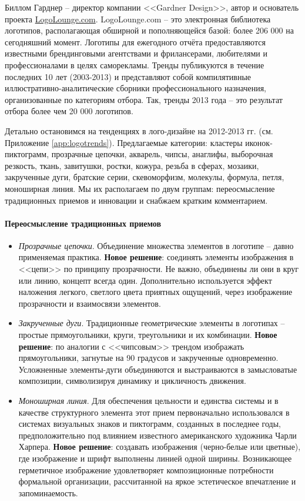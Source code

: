 Биллом Гарднер -- директор компании <<Gardner Design>>, автор и основатель проекта
\url{LogoLounge.com}. LogoLounge.com -- это электронная библиотека логотипов, располагающая обширной и
пополняющейся базой: более 206 000 на сегодняшний момент. Логотипы для ежегодного отчёта
предоставляются известными брендинговыми агентствами и фрилансерами, любителями и профессионалами в
целях саморекламы. Тренды публикуются в течение последних 10 лет (2003-2013) и представляют собой
компилятивные иллюстративно-аналитические сборники профессионального назначения, организованные по
категориям отбора. Так, тренды 2013 года -- это результат отбора более чем 20 000 логотипов.
\autocite{link:logolounge2012}\autocite{link:logolounge2013}

Детально остановимся на тенденциях в лого-дизайне на 2012-2013 гг.
(см. Приложение \ref{app:logotrends}). Предлагаемые категории: кластеры иконок-пиктограмм,
прозрачные цепочки, акварель, чипсы, анаглифы, выборочная резкость, ткань, завитушки, ростки,
кожура, резьба в сферах, мозаики, закрученные дуги, братские серии, скевоморфизм, молекулы, формула,
петля, моноширная линия.  Мы их располагаем по двум группам: переосмысление традиционных приемов
и инновации и снабжаем кратким комментарием.

\paragraph{Переосмысление традиционных приемов}
\begin{itemize}
\item \emph{Прозрачные цепочки}. Объединение множества элементов в логотипе -- давно применяемая
  практика. \textbf{Новое решение}: соединять элементы изображения в <<цепи>> по принципу
  прозрачности. Не важно, объединены ли они в круг или линию, концепт всегда один. Дополнительно
  используется эффект наложения легкого, светлого цвета приятных ощущений, через изображение
  прозрачности и взаимосвязи элементов.
\item \emph{Закрученные дуги}. Традиционные  геометрические элементы в логотипах -- простые
  прямоугольники, круги, треугольники и их комбинации. \textbf{Новое решение}: по аналогии с
  <<чипсовым>> трендом изображать  прямоугольники,  загнутые на 90 градусов и закрученные
  одновременно. Усложненные элементы-дуги объединяются и выстраиваются в замысловатые композиции,
  символизируя динамику и цикличность движения.
\item \emph{Моноширная линия}.  Для обеспечения цельности и единства системы и в качестве структурного
  элемента этот прием первоначально использовался в системах визуальных знаков и пиктограмм,
  созданных в последнее годы, предположительно под влиянием известного американского художника
  Чарли Харпера. \textbf{Новое решение}: создавать изображения  (черно-белые или цветные), где
  изображение и шрифт выполнены линией одной ширины. Возникающее герметичное изображение
  удовлетворяет композиционные потребности  формальной организации, рассчитанной на яркое
  эстетическое впечатление и запоминаемость.
\end{itemize}

